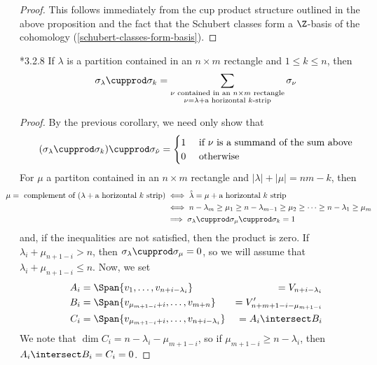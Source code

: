 \documentclass[11pt,leqno,oneside]{amsart}
\numberwithin{thm}{section}
\begin{document}
\begin{proof}
  This follows immediately from the cup product structure outlined in
  the above proposition and the fact that the Schubert classes form a
  \(\Z\)-basis of the cohomology (\ref{schubert-classes-form-basis}).
\end{proof}
\begin{thm}
  \cite{manivel}*{3.2.8} If \(\lambda\) is a partition contained in an
  \(n \times m\) rectangle and \(1 \leq k \leq n\), then \[
    \sigma_\lambda \cupprod \sigma_k = \sum_{\substack{\nu \text{
          contained in an }n\times m\text{ rectangle} \\ \nu = \lambda
        + \text{a horizontal }k\text{-strip}}} \sigma_\nu
  \]
\end{thm}
\begin{proof}
  By the previous corollary, we need only show that \[
    (\sigma_\lambda \cupprod \sigma_k) \cupprod \sigma_{\hat{\nu}} =
    \begin{cases}
      1 & \text{ if }\nu \text{ is a summand of the sum above}\\
      0 & \text{ otherwise}
    \end{cases}
  \]
  For \(\mu\) a partiton contained in an \(n \times m\) rectangle and
  \(|\lambda|+|\mu| = nm-k\), then
  \begin{align*}
    \hspace{-0.25in} \mu = \text{ complement of }(\lambda + \text{a horizontal }k\text{
    strip}) & \iff \hat{\lambda} = \mu + \text{a horizontal }k\text{ strip}\\
    & \iff n-\lambda_m \geq \mu_1 \geq n-\lambda_{m-1} \geq \mu_2 \geq \cdots
    \geq n-\lambda_1 \geq \mu_m \\
    & \implies \sigma_\lambda \cupprod
    \sigma_\mu \cupprod \sigma_k = 1
  \end{align*}
  and, if the inequalities are not satisfied, then the product is
  zero. If \(\lambda_i + \mu_{n+1-i} > n\), then \(\sigma_\lambda
  \cupprod \sigma_\mu = 0\), so we will assume that \(\lambda_i +
  \mu_{n+1-i} \leq n\). Now, we set
  \begin{align*}
    A_i & = \Span\{v_1, \ldots, v_{n+i-\lambda_i}\}
    & = V_{n+i-\lambda_i} \\
    B_i & = \Span\{v_{\mu_{m+1-i}+i}, \ldots, v_{m+n}\}
    & = V'_{n+m+1-i-\mu_{m+1-i}} \\
    C_i & = \Span \{v_{\mu_{m+1-i}+i}, \ldots, v_{n+i-\lambda_i}\}
    & = A_i \intersect B_i
  \end{align*}
  We note that \(\dim C_i = n-\lambda_i-\mu_{m+1-i}\), so if
  \(\mu_{m+1-i} \geq n-\lambda_i\), then \(A_i \intersect B_i = C_i =
  0\). 
\end{proof}
\end{document}
